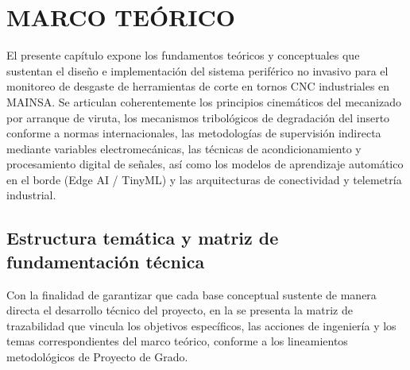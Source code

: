 ﻿%

\newpage
\section{MARCO TEÓRICO}
\label{sec:marco_teorico}

El presente capítulo expone los fundamentos teóricos y conceptuales que sustentan el diseño e implementación del sistema periférico no invasivo para el monitoreo de desgaste de herramientas de corte en tornos CNC industriales en MAINSA. Se articulan coherentemente los principios cinemáticos del mecanizado por arranque de viruta, los mecanismos tribológicos de degradación del inserto conforme a normas internacionales, las metodologías de supervisión indirecta mediante variables electromecánicas, las técnicas de acondicionamiento y procesamiento digital de señales, así como los modelos de aprendizaje automático en el borde (Edge AI / TinyML) y las arquitecturas de conectividad y telemetría industrial.

\subsection{Estructura temática y matriz de fundamentación técnica}
Con la finalidad de garantizar que cada base conceptual sustente de manera directa el desarrollo técnico del proyecto, en la  se presenta la matriz de trazabilidad que vincula los objetivos específicos, las acciones de ingeniería y los temas correspondientes del marco teórico, conforme a los lineamientos metodológicos de Proyecto de Grado.

